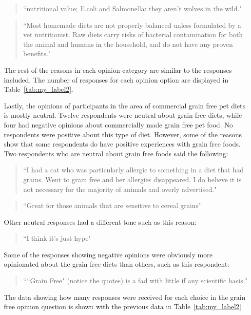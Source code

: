 \begin{quote}
``nutritional value; E.coli and Salmonella: they aren't wolves in the wild."
\end{quote}
\begin{quote}
``Most homemade diets are not properly balanced unless formulated by a vet nutritionist. Raw diets carry risks of bacterial contamination for both the animal and humans in the household, and do not have any proven benefits."
\end{quote}
The rest of the reasons in each opinion category are similar to the responses included. The number of responses for each opinion option are displayed in Table~\ref{tab:my_label2}.
\par Lastly, the opinions of participants in the area of commercial grain free pet diets is mostly neutral. Twelve respondents were neutral about grain free diets, while four had negative opinions about commercially made grain free pet food. No respondents were positive about this type of diet. However, some of the reasons show that some respondents do have positive experiences with grain free foods. Two respondents who are neutral about grain free foods said the following:
\begin{quote}
``I had a cat who was particularly allergic to something in a diet that had grains. Went to grain free and her allergies disappeared. I do believe it is not necessary for the majority of animals and overly advertised."
\end{quote}
\begin{quote}
``Great for those animals that are sensitive to cereal grains"
\end{quote}
Other neutral responses had a different tone such as this reason:
\begin{quote}
``I think it's just hype"
\end{quote}
Some of the responses showing negative opinions were obviously more opinionated about the grain free diets than others, such as this respondent:
\begin{quote}
````Grain Free" (notice the quotes) is a fad with little if any scientific basis."
\end{quote}
The data showing how many responses were received for each choice in the grain free opinion question is shown with the previous data in Table~\ref{tab:my_label2}

